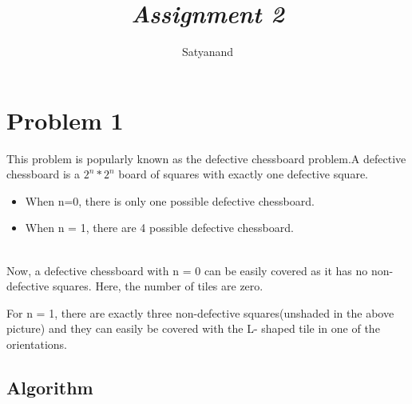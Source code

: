 \documentclass[12pt]{article}
\title{{\it Assignment 2\/} }
\author
{Satyanand\\
\normalize{\textbf{14EC10049}}
}
\date{}
\begin{document}
 


\baselineskip24pt


\maketitle 










\section*{Problem 1}

This problem is popularly known as the defective chessboard problem.A defective chessboard is a \begin{math}2^n * 2^n
\end{math}
board of squares with exactly one defective square.

\begin{itemize}
    \item When n=0, there is only one possible defective chessboard.
    \item When n = 1, there are 4 possible defective chessboard.
\end{itemize}

\\Now, a defective chessboard with n = 0 can be easily covered as it has no non-defective squares. Here, the number of tiles are zero.

\newline For n = 1, there are exactly three non-defective squares(unshaded in the above picture) and they can easily be covered with the L- shaped tile in one of the orientations.

\subsection*{Algorithm}
\end{document}
